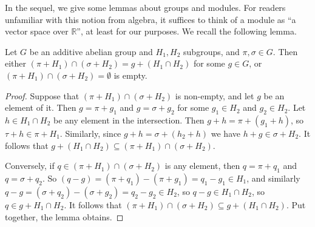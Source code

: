 In the sequel, we give some lemmas about groups and modules.
For readers unfamiliar with this notion from algebra, it suffices to think of a module as ``a vector space over $\mathbb R$'', at least for our purposes.
We recall the following lemma.
\begin{lemma}
	\label{thm:coset-intersection}
	Let $G$ be an additive abelian group and $H_1,H_2$ subgroups, and $\pi,\sigma\in G$.
	Then either $(\pi+H_1)\cap (\sigma+H_2)=g + (H_1\cap H_2)$ for some $g\in G$, or $(\pi+H_1)\cap (\sigma+H_2)=\emptyset$ is empty.
\end{lemma}
\begin{proof}
	Suppose that $(\pi+H_1)\cap (\sigma+H_2)$ is non-empty, and let $g$ be an element of it.
	Then $g=\pi+g_1$ and $g=\sigma+g_2$ for some $g_1\in H_2$ and $g_2\in H_2$.
	Let $h\in H_1\cap H_2$ be any element in the intersection.
	Then $g+h=\pi + (g_1+h)$, so $\tau+h\in \pi+H_1$.
	Similarly, since $g+h=\sigma+ (h_2+h)$ we have $h+g\in \sigma+H_2$.
	It follows that $g+(H_1\cap H_2)\subseteq (\pi+H_1)\cap (\sigma+H_2)$.
	
	Conversely, if $q\in (\pi+H_1)\cap (\sigma+H_2)$ is any element, then $q=\pi+q_1$ and $q=\sigma+q_2$.
	So $(q-g)=(\pi + q_1)-(\pi+g_1)=q_1-g_1\in H_1$, and similarly $q-g=(\sigma+q_2)-(\sigma+g_2)=q_2-g_2\in H_2$, so $q-g\in H_1\cap H_2$, so $q\in g+H_1\cap H_2$.
	It follows that $(\pi+H_1)\cap (\sigma+H_2)\subseteq g+(H_1\cap H_2)$.
	Put together, the lemma obtains.
\end{proof}

